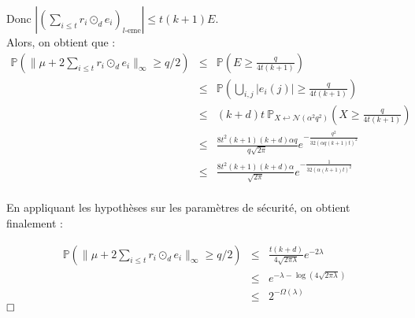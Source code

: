 \documentclass[11pt,a4paper]{article}
\begin{document}
Donc $|(\sum_{i \leq t}r_i \odot_d e_i)_{l\text{-eme}}|\leq t(k+1)E$. \\

Alors, on obtient que : 
\begin{eqnarray*}
\mathbb{P}(\|\mu + 2\sum_{i \leq t}r_i \odot_d e_i  \|_\infty \geq q/2 ) &\leq& \mathbb{P}(E \geq \frac{q}{4t(k+1)}) \\
&\leq& \mathbb{P}(\bigcup_{i,j}|e_i(j)| \geq \frac{q}{4t(k+1)}) \\
&\leq& (k+d)t \ \mathbb{P}_{X \hookleftarrow \mathcal{N}(\alpha^2 q^2)}(X \geq \frac{q}{4t(k+1)}) \\
&\leq& \frac{8t^2(k+1)(k+d)\alpha q}{q \sqrt{2\pi}} e^{-\frac{q^2}{32(\alpha q (k+1) t)^2}} \\
&\leq& \frac{8t^2(k+1)(k+d)\alpha}{\sqrt{2\pi}} e^{-\frac{1}{32(\alpha (k+1) t)^2}} \\
\end{eqnarray*}

En appliquant les hypothèses sur les paramètres de sécurité, on obtient finalement :

\begin{eqnarray*}
\mathbb{P}(\|\mu + 2\sum_{i \leq t}r_i \odot_d e_i  \|_\infty \geq q/2 ) &\leq& \frac{t(k+d)}{4\sqrt{2\pi\lambda}}e^{-2\lambda} \\
&\leq& e^{-\lambda-\log(4\sqrt{2\pi\lambda})} \\
&\leq& 2^{-\Omega(\lambda)}
\end{eqnarray*}
$\hfill \square$



\printbibliography[heading=bibintoc, title={Références}]
\end{document}
